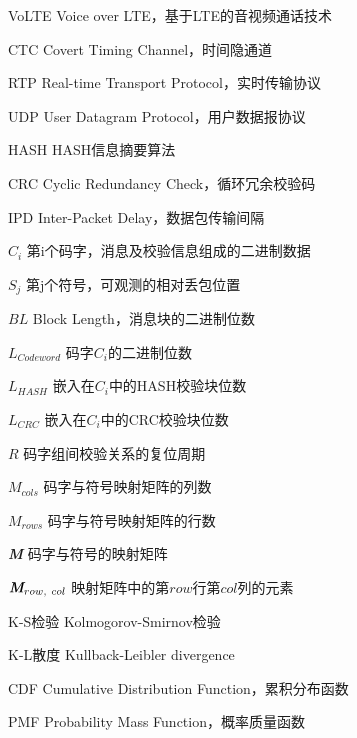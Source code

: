 \begin{denotation}
	
\item[VoLTE] Voice over LTE，基于LTE的音视频通话技术
\item[CTC] Covert Timing Channel，时间隐通道
\item[RTP] Real-time Transport Protocol，实时传输协议
\item[UDP] User Datagram Protocol，用户数据报协议
\item[HASH] HASH信息摘要算法
\item[CRC] Cyclic Redundancy Check，循环冗余校验码
\item[IPD] Inter-Packet Delay，数据包传输间隔
\item[] 
\item[$C_{i}$] 第i个码字，消息及校验信息组成的二进制数据
\item[$S_{j}$] 第j个符号，可观测的相对丢包位置
\item[$BL$] Block Length，消息块的二进制位数
\item[$L_{Codeword}$] 码字$C_{i}$的二进制位数
\item[$L_{HASH}$] 嵌入在$C_{i}$中的HASH校验块位数
\item[$L_{CRC}$] 嵌入在$C_{i}$中的CRC校验块位数
\item[$R$] 码字组间校验关系的复位周期
\item[$M_{cols}$] 码字与符号映射矩阵的列数
\item[$M_{rows}$] 码字与符号映射矩阵的行数
\item[\textit{\textbf{M}}] 码字与符号的映射矩阵
\item[$\textit{\textbf{M}}_{row,\ col}$] 映射矩阵中的第$row$行第$col$列的元素
\item[] 
\item[K-S检验] Kolmogorov-Smirnov检验
\item[K-L散度] Kullback-Leibler divergence
\item[CDF] Cumulative Distribution Function，累积分布函数
\item[PMF] Probability Mass Function，概率质量函数

\end{denotation}
